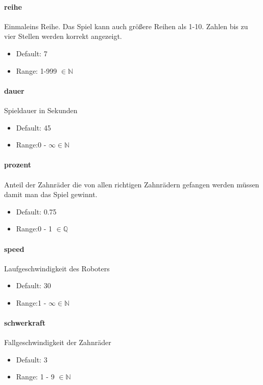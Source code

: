 \documentclass[]{article}
\begin{document}
\begin{multicols}{2}

	\paragraph{reihe}  Einmaleins Reihe. Das Spiel kann auch größere Reihen als 1-10. Zahlen bis zu vier Stellen werden korrekt angezeigt.
	\begin{itemize}
		\item Default: 7
		\item Range: 1-999 $\in \mathbb{N} $
	\end{itemize}

	\paragraph{dauer}  Spieldauer in Sekunden
	\begin{itemize}
		\item Default: 45
		\item Range:0 - $\infty \in \mathbb{N}$
	\end{itemize}
	\paragraph{prozent} Anteil der Zahnräder die von allen richtigen Zahnrädern gefangen werden müssen damit man das Spiel gewinnt.
	\begin{itemize}
		\item Default: 0.75
		\item Range:0 - 1 $\in \mathbb{Q}$
	\end{itemize}
	\paragraph{speed}  Laufgeschwindigkeit des Roboters
	\begin{itemize}
		\item Default: 30
		\item Range:1 - $\infty \in \mathbb{N}$
	\end{itemize}
	\paragraph{schwerkraft}  Fallgeschwindigkeit der Zahnräder
	\begin{itemize}
		\item Default: 3
		\item Range: 1 - 9 $\in \mathbb{N}$
	\end{itemize}

\end{multicols}
\end{document}
